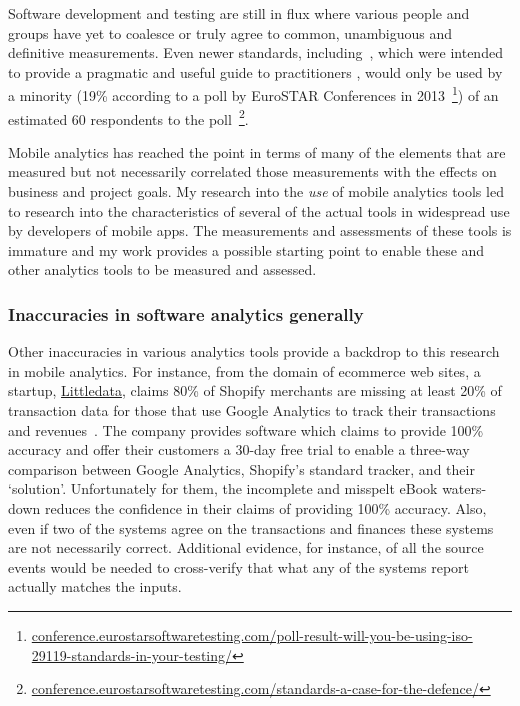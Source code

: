 Software development and testing are still in flux where various people and groups have yet to coalesce or truly agree to common, unambiguous and definitive measurements. Even newer standards, including~, which were intended to provide a pragmatic and useful guide to practitioners , would only be used by a minority (19\% according to a poll by EuroSTAR Conferences in 2013~\footnote{\href{https://conference.eurostarsoftwaretesting.com/poll-result-will-you-be-using-iso-29119-standards-in-your-testing/}{conference.eurostarsoftwaretesting.com/poll-result-will-you-be-using-iso-29119-standards-in-your-testing/}}) of an estimated 60 respondents to the poll~\footnote{\href{https://conference.eurostarsoftwaretesting.com/standards-a-case-for-the-defence/}{conference.eurostarsoftwaretesting.com/standards-a-case-for-the-defence/}}.

Mobile analytics has reached the point in terms of many of the elements that are measured but not necessarily correlated those measurements with the effects on business and project goals. My research into the \emph{use} of mobile analytics tools led to research into the characteristics of several of the actual tools in widespread use by developers of mobile apps. The measurements and assessments of these tools is immature and my work provides a possible starting point to enable these and other analytics tools to be measured and assessed.

\subsubsection{Inaccuracies in software analytics generally}
Other inaccuracies in various analytics tools provide a backdrop to this research in mobile analytics. For instance, from the domain of ecommerce web sites, a startup, \href{https://www.littledata.io/}{Littledata}, claims 80\% of Shopify merchants are missing at least 20\% of transaction data for those that use Google Analytics to track their transactions and revenues~. The company provides software which claims to provide 100\% accuracy and offer their customers a 30-day free trial to enable a three-way comparison between Google Analytics, Shopify's standard tracker, and their `solution'. Unfortunately for them, the incomplete and misspelt eBook waters-down reduces the confidence in their claims of providing 100\% accuracy. Also, even if two of the systems agree on the transactions and finances these systems are not necessarily correct. Additional evidence, for instance, of all the source events would be needed to cross-verify that what any of the systems report actually matches the inputs.

